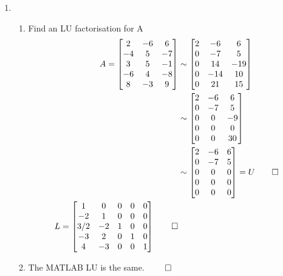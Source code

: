\documentclass[12pt, a4paper]{article}
\begin{document}
\begin{enumerate}[Q\arabic*.]
  \item \begin{enumerate}[(\alph*)]
      \item Find an LU factorisation for A 
        \begin{align*}
          A = \begin{bmatrix}
            2 & -6 & 6\\
            -4 & 5 & -7\\
            3 & 5 & -1\\
            -6 & 4 & -8\\
            8 & -3 & 9
          \end{bmatrix} &\sim
          \begin{bmatrix}
            2 & -6 & 6\\
            0 & -7 & 5\\
            0 & 14 & -19\\
            0 & -14 & 10\\
            0 & 21 & 15
          \end{bmatrix}\\&\sim
          \begin{bmatrix}
            2 & -6 & 6\\
            0 & -7 & 5\\
            0 & 0 & -9\\
            0 & 0 & 0 \\
            0 & 0 & 30
          \end{bmatrix}\\&\sim
          \begin{bmatrix}
            2 & -6 & 6\\
            0 & -7 & 5\\
            0 & 0 & 0\\
            0 & 0 & 0 \\
            0 & 0 & 0
          \end{bmatrix} = U \qed \\
          L = \begin{bmatrix}
            1 & 0 & 0 & 0 & 0\\
            -2 & 1 & 0 & 0 & 0\\
            3/2 & -2 & 1 & 0 & 0\\
            -3 & 2 & 0 & 1 & 0\\
            4 & -3 & 0 & 0 & 1
          \end{bmatrix} \qed
        \end{align*}
      \item The MATLAB LU is the same. $\qed$
    \end{enumerate}


\end{enumerate}
\end{document}
